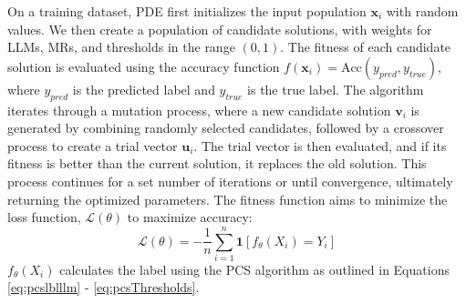 On a training dataset, PDE first initializes the input population $\mathbf{x}_i$ with random values. We then create a population of candidate solutions, with weights for LLMs, MRs, and thresholds in the range $(0, 1)$. The fitness of each candidate solution is evaluated using the accuracy function $f(\mathbf{x}_i) = \text{Acc}(y_{pred}, y_{true})$, where $y_{pred}$ is the predicted label and $y_{true}$ is the true label. The algorithm iterates through a mutation process, where a new candidate solution $\mathbf{v}_i$ is generated by combining randomly selected candidates, followed by a crossover process to create a trial vector $\mathbf{u}_i$. The trial vector is then evaluated, and if its fitness is better than the current solution, it replaces the old solution. This process continues for a set number of iterations or until convergence, ultimately returning the optimized parameters. The fitness function aims to minimize the loss function, $\mathcal{L}(\theta)$ to maximize accuracy:
\begin{equation}
\mathcal{L}(\theta) = -\frac{1}{n} \sum_{i=1}^n \mathbf{1}[f_{\theta}(X_i) = Y_i]
\end{equation}
$f_{\theta}(X_i)$ calculates the label using the PCS algorithm as outlined in Equations \ref{eq:pcslblllm} - \ref{eq:pcsThresholds}.